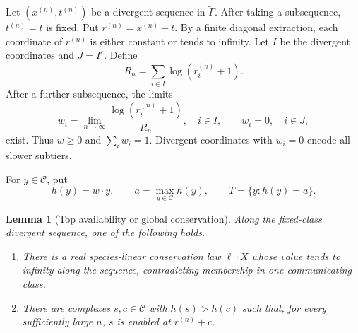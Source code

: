 \documentclass[11pt]{article}
\newtheorem{lemma}[theorem]{Lemma}
\theoremstyle{definition}
\newcommand{\Ccal}{\mathcal C}
\newcommand{\wtG}{\widetilde\Gamma}
\begin{document}
Let \((x^{(n)},t^{(n)})\) be a divergent sequence in \(\wtG\).  After taking a
subsequence, \(t^{(n)}=t\) is fixed.  Put \(r^{(n)}=x^{(n)}-t\).  By a finite
diagonal extraction, each coordinate of \(r^{(n)}\) is either constant or
tends to infinity.  Let \(I\) be the divergent coordinates and \(J=I^c\).
Define
\[
  R_n=\sum_{i\in I}\log(r_i^{(n)}+1).
\]
After a further subsequence, the limits
\begin{equation}\label{eq:w}
  w_i=\lim_{n\to\infty}
      \frac{\log(r_i^{(n)}+1)}{R_n},\quad i\in I,
  \qquad
  w_i=0,\quad i\in J,
\end{equation}
exist.  Thus \(w\geq0\) and \(\sum_iw_i=1\).  Divergent coordinates with
\(w_i=0\) encode all slower subtiers.

For \(y\in\Ccal\), put
\[
  h(y)=w\cdot y,
  \qquad
  a=\max_{y\in\Ccal}h(y),
  \qquad
  T=\{y:h(y)=a\}.
\]

\begin{lemma}[Top availability or global conservation]\label{lem:top}
Along the fixed-class divergent sequence, one of the following holds.

\begin{enumerate}[label=(\roman*)]
\item There is a real species-linear conservation law \(\ell\cdot X\) whose
      value tends to infinity along the sequence, contradicting membership
      in one communicating class.
\item There are complexes \(s,c\in\Ccal\) with \(h(s)>h(c)\) such that, for
      every sufficiently large \(n\), \(s\) is enabled at \(r^{(n)}+c\).
\end{enumerate}
\end{lemma}
\end{document}
